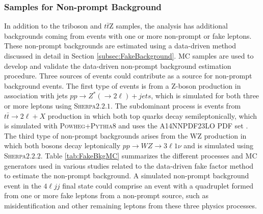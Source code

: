 \subsubsection{Samples for Non-prompt Background}
\label{subsubsec:FakeBkgSamples}
In addition to the triboson and $t\bar{t}$Z samples, the analysis has additional backgrounds coming from events with one or more non-prompt or fake leptons. These non-prompt backgrounds are estimated using a data-driven method discussed in detail in Section \ref{subsec:FakeBackground}. MC samples are used to develop and validate the data-driven non-prompt background estimation procedure. Three sources of events could contribute as a source for non-prompt background events. The first type of events is from a Z-boson production in association with jets $pp \rightarrow Z^{*} (\rightarrow 2\ell) +jets$, which is simulated for both three or more leptons using \textsc{Sherpa}$2.2.1$. The subdominant process is events from $t\bar{t}\rightarrow 2\ell +X$ production in which both top quarks decay semileptonically, which is simulated with \textsc{Powheg+Pythia8} and uses the A14NNPDF23LO PDF set \cite{PowhegPythia}. The third type of non-prompt backgrounds arises from the WZ production in which both bosons decay leptonically $pp \rightarrow WZ \rightarrow 3 \ell 1\nu $ and is simulated using \textsc{Sherpa}$2.2.2$. Table \ref{tab:FakeBkgMC} summarizes the different processes and MC generators used in various studies related to the data-driven fake factor method to estimate the non-prompt background. A simulated non-prompt background event in the $4\ell jj$ final state could comprise an event with a quadruplet formed from one or more fake leptons from a non-prompt source, such as misidentification and other remaining leptons from these three physics processes.

